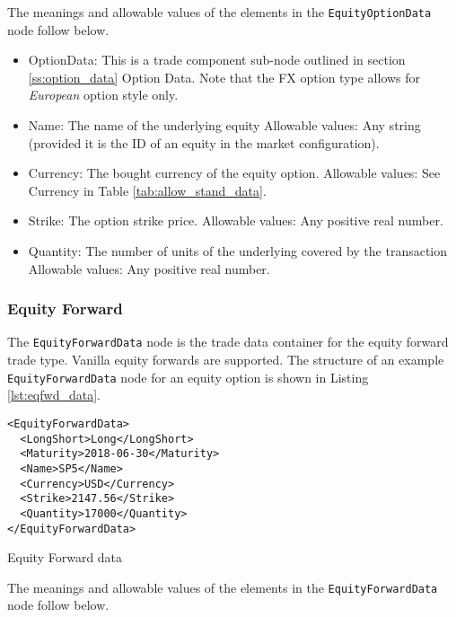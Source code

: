 The meanings and allowable values of the elements in the \lstinline!EquityOptionData!  node follow below.

\begin{itemize}
	\item OptionData: This is a trade component sub-node outlined in section \ref{ss:option_data} Option Data. Note 
	that the FX option type allows for \emph{European} option style only.	
	\item Name: The name of the underlying equity 	
	Allowable values:  Any string (provided it is the ID of an equity in the market configuration).
	\item Currency: The bought currency of the equity option.  	
	Allowable values:  See Currency in Table \ref{tab:allow_stand_data}.	
	\item Strike: The option strike price.  
	Allowable values:  Any positive real number.	
	\item Quantity: The number of units of the underlying covered by the transaction  
	Allowable values:  Any positive real number.
\end{itemize}

\subsubsection{Equity Forward}

The \lstinline!EquityForwardData!  node is the trade data container for the equity forward trade type.  Vanilla equity 
forwards are supported. The structure of an example \lstinline!EquityForwardData! node for an equity option is shown in 
Listing \ref{lst:eqfwd_data}.

\begin{listing}[H]
\begin{verbatim}
<EquityForwardData>
  <LongShort>Long</LongShort>
  <Maturity>2018-06-30</Maturity>
  <Name>SP5</Name>
  <Currency>USD</Currency>
  <Strike>2147.56</Strike>
  <Quantity>17000</Quantity>
</EquityForwardData>
\end{verbatim}
\caption{Equity Forward data}
\label{lst:eqfwd_data}
\end{listing}

The meanings and allowable values of the elements in the \lstinline!EquityForwardData!  node follow below.

